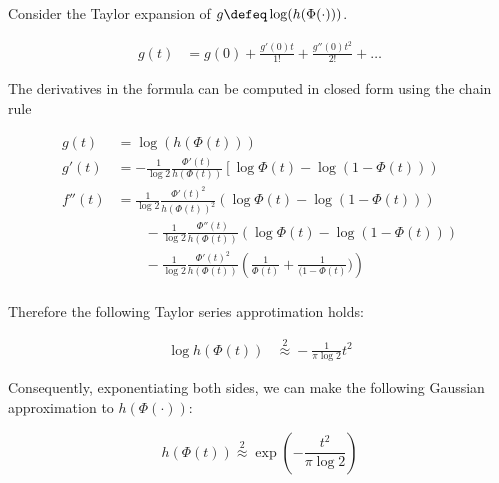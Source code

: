 Consider the Taylor expansion of $g \defeq \log(h(\Phi(\cdot)))$.

\begin{align}
	g(t) &= g(0) + \frac{g'(0)t}{1!} + \frac{g''(0)t^2}{2!} + \dots
\end{align}

The derivatives in the formula can be computed in closed form using the chain rule

\begin{align}
	g(t) &= \log(h(\Phi(t)))\\
	g'(t) &= -\frac{1}{\log 2}\frac{\Phi'(t)}{h(\Phi(t))}\left[\log\Phi(t) - \log(1-\Phi(t))  \right) \nonumber \\ 
	f''(t) &= \frac{1}{\log 2}\frac{\Phi'(t)^2}{h(\Phi(t))^2}\left(\log\Phi(t) - \log(1-\Phi(t))  \right)\nonumber\\
	& \qquad - \frac{1}{\log 2}\frac{\Phi''(t)}{h(\Phi(t))}\left(\log\Phi(t) - \log(1-\Phi(t))  \right) \nonumber\\
	& \qquad - \frac{1}{\log 2}\frac{\Phi'(t)^2}{h(\Phi(t))}\left(\frac{1}{\Phi(t)} + \frac{1}{(1-\Phi(t)})  \right) \nonumber\\
\end{align}

Therefore the following Taylor series approtimation holds:

\begin{align}
	\log h(\Phi(t)) &\stackrel{2}{\approx} - \frac{1}{\pi\log 2}t^2
\end{align}

Consequently, exponentiating both sides, we can make the following Gaussian approximation to $h(\Phi(\cdot))$:

\begin{equation}
	h(\Phi(t))\stackrel{2}{\approx}\exp\left({-\frac{t^2}{\pi\log 2}}\right)
\end{equation}

